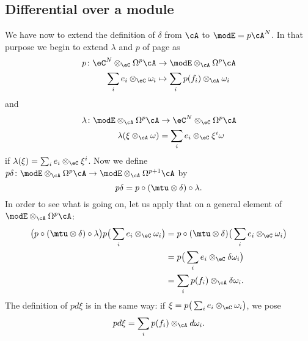 \subsection{Differential over a module}

We have now to extend the definition of $\delta$ from $\cA$ to $\modE=p\cA^N$. In that purpose we begin to extend $\lambda$ and $p$ of page \pageref{PgdeflambdaMod} as
\begin{equation}
	\begin{aligned}
		p\colon \eC^N\otimes_{\eC}\Omega^p\cA & \to \modE\otimes_{\cA}\Omega^p\cA         \\
		\sum_{i}e_i\otimes_{\eC}\omega_i      & \mapsto \sum_ip(f_i)\otimes_{\cA}\omega_i
	\end{aligned}
\end{equation}
and
\begin{equation}
	\begin{aligned}
		\lambda\colon \modE\otimes_{\cA}\Omega^p\cA & \to \eC^N\otimes_{\eC}\Omega^p\cA   \\
		\lambda(\xi\otimes_{\cA}\omega)             & =\sum_i e_i\otimes_{\eC}\xi^i\omega
	\end{aligned}
\end{equation}
if $\lambda(\xi)=\sum_ie_i\otimes_{\eC}\xi^i$. Now we define $p\delta\colon\modE\otimes_{\cA}\Omega^p\cA\to \modE\otimes_{\cA}\Omega^{p+1}\cA$ by
\[
	p\delta=p\circ(\mtu\otimes\delta)\circ\lambda.
\]
In order to see what is going on, let us apply that on a general element of $\modE\otimes_{\cA}\Omega^p\cA$:
\begin{align*}
	\big( p\circ(\mtu\otimes\delta)\circ\lambda \big)p\big( \sum_ie_i\otimes_{\eC}\omega_i \big) & =p\circ(\mtu\otimes\delta)\big( \sum_ie_i\otimes_{\eC}\omega_i \big) \\
	                                                                                             & =p\big( \sum_ie_i\otimes_{\eC}\delta\omega_i \big)                   \\
	                                                                                             & =\sum_ip(f_i)\otimes_{\cA}\delta\omega_i.
\end{align*}
The definition of $pd\xi$ is in the same way: if $\xi=p\big( \sum_ie_i\otimes_{\eC}\omega_i \big)$, we pose
\begin{equation}
	pd\xi=\sum_ip(f_i)\otimes_{\cA}d\omega_i.
\end{equation}



